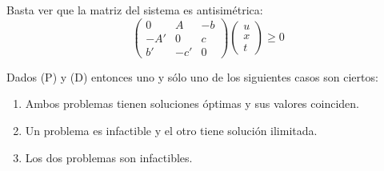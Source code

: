 \documentclass[PM.tex]{subfiles}
\begin{document}
\begin{dem}
Basta ver que la matriz del sistema es antisimétrica:
\[ \begin{pmatrix}
	0  &  A  & -b\\
	-A' &  0  & c\\
	b'& -c'  & 0 
\end{pmatrix}\begin{pmatrix}
	u\\x\\t
\end{pmatrix} ≥ 0 \]
\end{dem}

\begin{theorem}
Dados (P) y (D) entonces uno y sólo uno de los siguientes casos son ciertos:
\begin{enumerate}
	\item Ambos problemas tienen soluciones óptimas y sus valores coinciden.
	\item Un problema es infactible y el otro tiene solución ilimitada.
	\item Los dos problemas son infactibles.
\end{enumerate}
\end{theorem}
\end{document}
